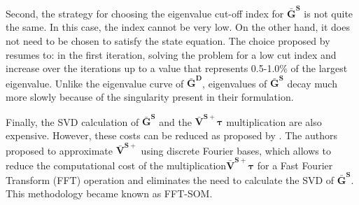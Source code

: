			Second, the strategy for choosing the eigenvalue cut-off index for $\mathbf{\bar{G}^S}$ is not quite the same. In this case, the index cannot be very low. On the other hand, it does not need to be chosen to satisfy the state equation. The choice proposed by \cite{zhong2009twofold} resumes to: in the first iteration, solving the problem for a low cut index and increase over the iterations up to a value that represents 0.5-1.0\% of the largest eigenvalue. Unlike the eigenvalue curve of $\mathbf{\bar{G}^D}$, eigenvalues of $\mathbf{\bar{G}^S}$ decay much more slowly because of the singularity present in their formulation.
			
			Finally, the SVD calculation of $\mathbf{\bar{G}^S}$ and the $\mathbf{\bar{V}^{S+}}\boldsymbol{\tau}$ multiplication are also expensive. However, these costs can be reduced as proposed by \cite{zhong2011fft}. The authors proposed to approximate $\mathbf{\bar{V}^{S+}}$ using discrete Fourier bases, which allows to reduce the computational cost of the multiplication$\mathbf{\bar{V}^{S+}}\boldsymbol{\tau}$ for a Fast Fourier Transform (FFT) operation and eliminates the need to calculate the SVD of $\mathbf{\bar{G}^S}$. This methodology became known as FFT-SOM.
			
